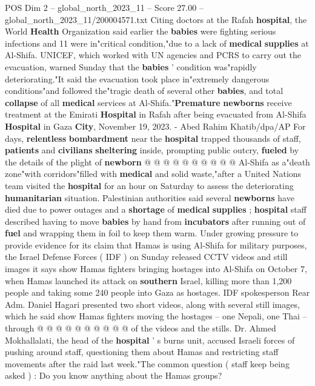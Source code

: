 \begin{textsample}{POS Dim 2 – global\_north\_2023\_11 – Score 27.00 – global\_north\_2023\_11/200004571.txt}
Citing doctors at the Rafah \textbf{hospital}, the World \textbf{Health} Organization said earlier the \textbf{babies} were fighting serious infections and 11 were in"critical condition,"due to a lack of \textbf{medical} \textbf{supplies} at Al-Shifa.
UNICEF, which worked with UN agencies and PCRS to carry out the evacuation, warned Sunday that the \textbf{babies} ' condition was"rapidly deteriorating."It said the evacuation took place in"extremely dangerous conditions"and followed the"tragic death of several other \textbf{babies}, and total \textbf{collapse} of all \textbf{medical} services at Al-Shifa."\textbf{Premature} \textbf{newborns} receive treatment at the Emirati \textbf{Hospital} in Rafah after being evacuated from Al-Shifa \textbf{Hospital} in Gaza \textbf{City}, November 19, 2023. - Abed Rahim Khatib/dpa/AP For days, \textbf{relentless} \textbf{bombardment} near the \textbf{hospital} trapped thousands of staff, \textbf{patients} and \textbf{civilians} \textbf{sheltering} inside, prompting public outcry, \textbf{fueled} by the details of the plight of \textbf{newborn} @ @ @ @ @ @ @ @ @ @ Al-Shifa as a"death zone"with corridors"filled with \textbf{medical} and solid waste,"after a United Nations team visited the \textbf{hospital} for an hour on Saturday to assess the deteriorating \textbf{humanitarian} situation.
Palestinian authorities said several \textbf{newborns} have died due to power outages and a \textbf{shortage} of \textbf{medical} \textbf{supplies} ; \textbf{hospital} staff described having to move \textbf{babies} by hand from \textbf{incubators} after running out of \textbf{fuel} and wrapping them in foil to keep them warm.
Under growing pressure to provide evidence for its claim that Hamas is using Al-Shifa for military purposes, the Israel Defense Forces ( IDF ) on Sunday released CCTV videos and still images it says show Hamas fighters bringing hostages into Al-Shifa on October 7, when Hamas launched its attack on \textbf{southern} Israel, killing more than 1,200 people and taking some 240 people into Gaza as hostages.
IDF spokesperson Rear Adm.
Daniel Hagari presented two short videos, along with several still images, which he said show Hamas fighters moving the hostages -- one Nepali, one Thai -- through @ @ @ @ @ @ @ @ @ @ of the videos and the stills.
Dr.
Ahmed Mokhallalati, the head of the \textbf{hospital} ' s burns unit, accused Israeli forces of pushing around staff, questioning them about Hamas and restricting staff movements after the raid last week."The common question ( staff keep being asked ) : Do you know anything about the Hamas groups?

\end{textsample}
